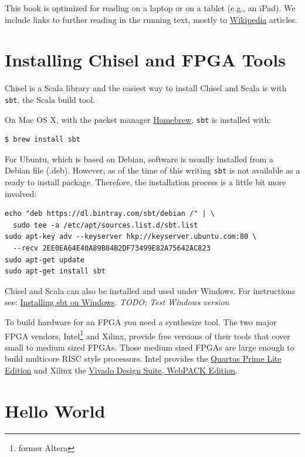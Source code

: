 \documentclass[%
    10pt, %
    headinclude, footexclude,
    openright, %
    notitlepage,
    cleardoubleempty,
    headsepline,
    pointlessnumbers,
    bibtotoc, idxtotoc,
    ]{scrbook}
\newcommand{\code}[1]{{\small{\texttt{#1}}}}
\newcommand{\todo}[1]{{\emph{TODO: #1}}}
\newcommand{\myref}[2]{\href{#1}{#2}}
\begin{document}
This book is optimized for reading on a laptop or on a tablet (e.g., an iPad).
We include links to further reading in the running text, mostly to
\myref{https://en.wikipedia.org/}{Wikipedia} articles.

\section{Installing Chisel and FPGA Tools}

Chisel is a Scala library and the easiest way to install Chisel and Scala is
with \code{sbt}, the Scala build tool.

On Mac OS X, with the packet manager \myref{https://brew.sh/}{Homebrew},
\code{sbt} is installed with:

\begin{verbatim}
$ brew install sbt
\end{verbatim}

\noindent For Ubuntu, which is based on Debian, software is usually installed from a
Debian file (.deb). However, as of the time of this writing \code{sbt} is not
available as a ready to install package. Therefore, the installation process
is a little bit more involved:
\begin{verbatim}
echo "deb https://dl.bintray.com/sbt/debian /" | \
  sudo tee -a /etc/apt/sources.list.d/sbt.list
sudo apt-key adv --keyserver hkp://keyserver.ubuntu.com:80 \
  --recv 2EE0EA64E40A89B84B2DF73499E82A75642AC823
sudo apt-get update
sudo apt-get install sbt
\end{verbatim}



Chisel and Scala can also be installed and used under Windows.
For instructions see:
\myref{https://www.scala-sbt.org/1.x/docs/Installing-sbt-on-Windows.html}{Installing sbt on Windows}.
\todo{Test Windows version}

To build hardware for an FPGA you need a synthesize tool. The two major
FPGA vendors, Intel\footnote{former Altera} and Xilinx, provide free versions of
their tools that cover small to medium sized FPGAs. Those medium sized
FPGAs are large enough to build multicore RISC style processors.
Intel provides the \myref{https://www.altera.com/products/design-software/fpga-design/quartus-prime/download.html}{Quartus Prime Lite Edition} and Xilinx the
\myref{https://www.xilinx.com/products/design-tools/vivado/vivado-webpack.html}{Vivado Design Suite, WebPACK Edition}.

\section{Hello World}
\end{document}
